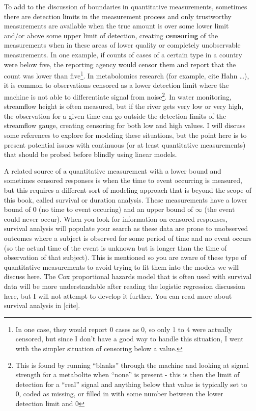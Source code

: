 \documentclass[
]{book}
\begin{document}
To add to the discussion of boundaries in quantitative measurements, sometimes there are detection limits in the measurement process and only trustworthy measurements are available when the true amount is over some lower limit and/or above some upper limit of detection, creating \textbf{censoring} of the measurements when in these areas of lower quality or completely unobservable measurements. In one example, if counts of cases of a certain type in a country were below five, the reporting agency would censor them and report that the count was lower than five\footnote{In one case, they would report 0 cases as 0, so only 1 to 4 were actually censored, but since I don't have a good way to handle this situation, I went with the simpler situation of censoring below a value.}. In metabolomics research (for example, cite Hahn \ldots), it is common to observations censored as a lower detection limit where the machine is not able to differentiate signal from noise\footnote{This is found by running ``blanks'' through the machine and looking at signal strength for a metabolite when ``none'' is present - this is then the limit of detection for a ``real'' signal and anything below that value is typically set to 0, coded as missing, or filled in with some number between the lower detection limit and 0}. In water monitoring, streamflow height is often measured, but if the river gets very low or very high, the observation for a given time can go outside the detection limits of the streamflow gauge, creating censoring for both low and high values. I will discuss some references to explore for modeling these situations, but the point here is to present potential issues with continuous (or at least quantitative measurements) that should be probed before blindly using linear models.

A related source of a quantitative measurement with a lower bound and sometimes censored responses is when the time to event occurring is measured, but this requires a different sort of modeling approach that is beyond the scope of this book, called survival or duration analysis. These measurements have a lower bound of 0 (no time to event occuring) and an upper bound of \(\infty\) (the event could never occur). When you look for information on censored responses, survival analysis will populate your search as these data are prone to unobserved outcomes where a subject is observed for some period of time and no event occurs (so the actual time of the event is unknown but is longer than the time of observation of that subject). This is mentioned so you are aware of these type of quantitative measurements to avoid trying to fit them into the models we will discuss here. The Cox proportional hazards model that is often used with survival data will be more understandable after reading the logistic regression discussion here, but I will not attempt to develop it further. You can read more about survival analysis in {[}cite{]}.
\end{document}
